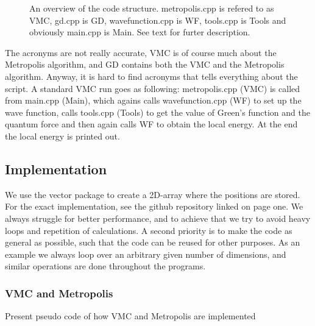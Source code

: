 \documentclass[norsk,a4paper,12pt]{article}
\begin{document}
\begin{figure}[H]
\centering
{}
\caption{An overview of the code structure. metropolis.cpp is refered to as VMC, gd.cpp is GD, wavefunction.cpp is WF, tools.cpp is Tools and obviously main.cpp is Main. See text for furter description.}
\label{fig:code_structure}
\end{figure}
The acronyms are not really accurate, VMC is of course much about the Metropolis algorithm, and GD contains both the VMC and the Metropolis algorithm. Anyway, it is hard to find acronyms that tells everything about the script. A standard VMC run goes as following: metropolis.cpp (VMC) is called from main.cpp (Main), which agains calls wavefunction.cpp (WF) to set up the wave function, calls tools.cpp (Tools) to get the value of Green's function and the quantum force and then again calls WF to obtain the local energy. At the end the local energy is printed out.

\subsection{Implementation}
We use the vector package to create a 2D-array where the positions are stored. For the exact implementation, see the github repository linked on page one. We always struggle for better performance, and to achieve that we try to avoid heavy loops and repetition of calculations. A second priority is to make the code as general as possible, such that the code can be reused for other purposes. As an example we always loop over an arbitrary given number of dimensions, and similar operations are done throughout the programs. 

\subsubsection{VMC and Metropolis}
Present pseudo code of how VMC and Metropolis are implemented
\end{document}
